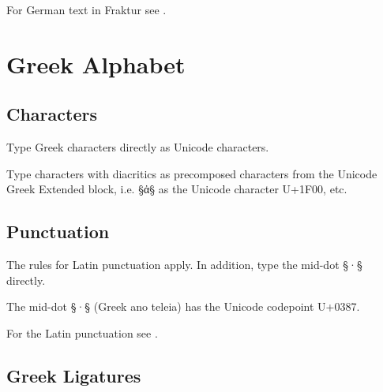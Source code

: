 
\begin{crossref}
For German text in Fraktur see .
\end{crossref}


\section{Greek Alphabet}

\tocspace
\subsection{Characters}

\begin{mainrule}
Type Greek characters directly as Unicode characters. 
\end{mainrule}

\begin{clarification}
Type characters with diacritics as precomposed characters from the Unicode Greek Extended block, i.e. §ἀ§ as the Unicode character U+1F00, etc.
\end{clarification}


\tocspace
\subsection{Punctuation}
\label{section greek punctuation}

\begin{mainrule}
The rules for Latin punctuation apply. In addition, type the mid-dot §·§ directly.
\end{mainrule}

\begin{clarification}
The mid-dot §·§ (Greek ano teleia) has the Unicode codepoint U+0387. 
\end{clarification}

\begin{crossref}
For the Latin punctuation see .
\end{crossref}


\tocspace
\subsection{Greek Ligatures}
\label{section greek ligatures}

